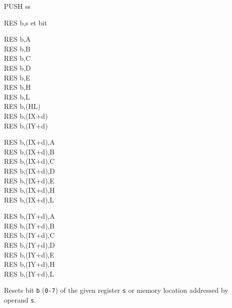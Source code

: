 \begin{basedescript}{
    \desclabelstyle{\multilinelabel}
    \desclabelwidth{3cm}}
\begin{DetailItem}{PUSH ss}
    \end{DetailItem}

    \begin{DetailItem}{RES b,s}
        {et bit}
        {}

        \begin{DetailVariants}
            RES b,A\\
            RES b,B\\
            RES b,C\\
            RES b,D\\
            RES b,E\\
            RES b,H\\
            RES b,L\\
            RES b,(HL)\\
            RES b,(IX+d)\\
            RES b,(IY+d)

            \columnbreak
            RES b,(IX+d),A\UNDOC\\
            RES b,(IX+d),B\UNDOC\\
            RES b,(IX+d),C\UNDOC\\
            RES b,(IX+d),D\UNDOC\\
            RES b,(IX+d),E\UNDOC\\
            RES b,(IX+d),H\UNDOC\\
            RES b,(IX+d),L\UNDOC

            \columnbreak
            RES b,(IY+d),A\UNDOC\\
            RES b,(IY+d),B\UNDOC\\
            RES b,(IY+d),C\UNDOC\\
            RES b,(IY+d),D\UNDOC\\
            RES b,(IY+d),E\UNDOC\\
            RES b,(IY+d),H\UNDOC\\
            RES b,(IY+d),L\UNDOC
        \end{DetailVariants}

        Resets bit {\tt b} ({\tt 0-7}) of the given register {\tt s} or memory location addressed by operand {\tt s}.

        \begin{DetailEffects}
            \FlagsRESr
        \end{DetailEffects}
						

\end{DetailItem}
\end{basedescript}
